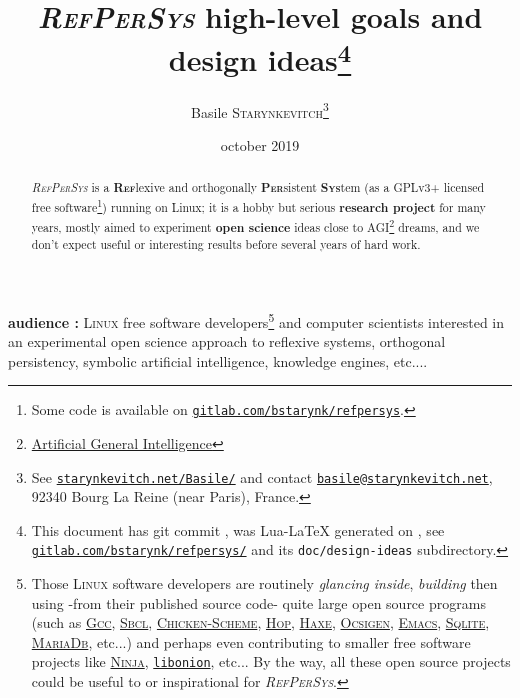 \documentclass[11pt,a4paper,svgnames]{techreport}
\date{october 2019}
\newcommand{\mygitid}{\luadirect{tex.print(gitid)}}
\newcommand{\mydatetime}{\luadirect{tex.print(docdatetime)}}
\newcommand{\RefPerSys}{{\textit{\textsc{RefPerSys}}}}
\begin{document}
\title {\textit{\textsc{RefPerSys}} high-level goals and design
  ideas\thanks{This document has git commit \texttt{\mygitid},
    was Lua-{\LaTeX} generated on \textit{\mydatetime}, see
    \href{http://gitlab.com/bstarynk/refpersys}{\texttt{gitlab.com/bstarynk/refpersys/}}
    and its \texttt{doc/design-ideas} subdirectory.}}  \author {Basile
  \textsc{Starynkevitch}\thanks{See
    \href{http://starynkevitch.net/Basile/}{\texttt{starynkevitch.net/Basile/}}
    and contact
    \href{mailto:basile@starynkevitch.net}{\texttt{basile@starynkevitch.net}},
    92340 Bourg La Reine {(near Paris)}, France.}}

\begin{titlepage}
  \thispagestyle{empty}
  \maketitle

  \bigskip

  \begin{abstract}
    \textit{\textsc{RefPerSys}} is a \textsc{\textbf{Ref}}lexive and
    orthogonally \textsc{\textbf{Per}}sistent \textsc{\textbf{Sys}}tem
    (as a GPLv3+ licensed free software\footnote{Some code is
    available on
    \href{https://gitlab.com/bstarynk/refpersys}{\texttt{gitlab.com/bstarynk/refpersys}}.})
    running on Linux; it is a hobby but serious \textbf{research
      project} for many years, mostly aimed to experiment \textbf{open
      science} ideas close to
    {AGI}\footnote{{\href{https://en.wikipedia.org/wiki/Artificial\_general\_intelligence}{Artificial
        General Intelligence}}} dreams, and we don't expect useful or
    interesting results before several years of hard work.
  \end{abstract}

  \medskip

  \textbf{audience :} \textsc{Linux} free software
  developers\footnote{Those \textsc{Linux} software developers are
  routinely \emph{glancing inside}, \emph{building} then using -from
  their published source code- quite large open source programs (such
  as \href{http://gcc.gnu.org/}{\textsc{Gcc}},
  \href{http://sbcl.org/}{\textsc{Sbcl}},
  \href{https://www.call-cc.org/}{\textsc{Chicken-Scheme}},
  \href{http://hop.inria.fr/}{\textsc{Hop}},
  \href{https://haxe.org/}{\textsc{Haxe}},
  \href{https://ocsigen.org}{\textsc{Ocsigen}},
  \href{https://www.gnu.org/software/emacs/}{\textsc{Emacs}},
  \href{https://sqlite.org/}{\textsc{Sqlite}},
  \href{https://mariadb.org/}{\textsc{MariaDb}}, etc...)  and perhaps
  even contributing to smaller free software projects like
  \href{https://ninja-build.org/}{\textsc{Ninja}},
  \href{https://github.com/davidmoreno/onion}{\texttt{libonion}},
  etc... By the way, all these open source projects could be useful to
  or inspirational for \RefPerSys.} and computer scientists interested in
  an experimental open science approach to reflexive systems,
  orthogonal persistency, symbolic artificial intelligence, knowledge
  engines, etc....



\end{titlepage}
\end{document}
